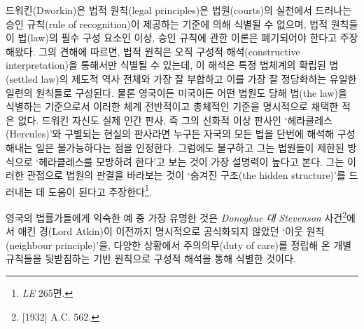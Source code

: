 드워킨(Dworkin)은 법적 원칙(legal principles)은 법원(courts)의 실천에서
드러나는 승인 규칙(rule of recognition)이 제공하는 기준에 의해 식별될 수
없으며, 법적 원칙들이 법(law)의 필수 구성 요소인 이상, 승인 규칙에 관한
이론은 폐기되어야 한다고 주장해왔다. 그의 견해에 따르면, 법적 원칙은
오직 구성적 해석(constructive interpretation)을 통해서만 식별될 수
있는데, 이 해석은 특정 법체계의 확립된 법(settled law)의 제도적 역사
전체와 가장 잘 부합하고 이를 가장 잘 정당화하는 유일한 일련의 원칙들로
구성된다. 물론 영국이든 미국이든 어떤 법원도 당해 법(the law)을 식별하는
기준으로서 이러한 체계 전반적이고 총체적인 기준을 명시적으로 채택한 적은
없다. 드워킨 자신도 실제 인간 판사, 즉 그의 신화적 이상 판사인
`헤라클레스(Hercules)'와 구별되는 현실의 판사라면 누구든 자국의 모든
법을 단번에 해석해 구성해내는 일은 불가능하다는 점을 인정한다. 그럼에도
불구하고 그는 법원들이 제한된 방식으로 `헤라클레스를 모방하려 한다'고
보는 것이 가장 설명력이 높다고 본다. 그는 이러한 관점으로 법원의 판결을
바라보는 것이 `숨겨진 구조(the hidden structure)'를 드러내는 데 도움이
된다고 주장한다\footnote{\emph{LE} 265면.}.

영국의 법률가들에게 익숙한 예 중 가장 유명한 것은 \emph{Donoghue 대
Stevenson} 사건\footnote{{[}1932{]} A.C. 562.}에서 애킨 경(Lord Atkin)이
이전까지 명시적으로 공식화되지 않았던 `이웃 원칙(neighbour
principle)'을, 다양한 상황에서 주의의무(duty of care)를 정립해 온 개별
규칙들을 뒷받침하는 기반 원칙으로 구성적 해석을 통해 식별한 것이다.

